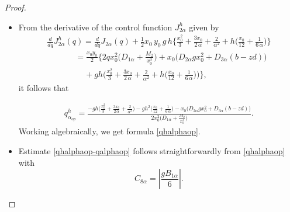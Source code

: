 \documentclass[axioms,article,submit,moreauthors]{Definitions/mdpi}
\begin{document}
    \begin{proof} $ $
    
    
    
    \begin{itemize}
    \item[(a)]From the derivative of the control function ${ J^h_{2 \alpha}}$ given by
     \begin{equation*}
  \begin{array}{ll}
  { \frac{d}{dq} J^h_{2 \alpha}}(q)= {\frac{d}{dq}J_{2\alpha}}(q) + \tfrac{1}{2} x_0\,y_0 \,g \,h \Big \{   \tfrac{ x_0^2}{3} 
    + \tfrac{3 x_0 }{2\,\alpha} + \tfrac{2}{\alpha^2}
    + h \Big( \tfrac{x_0}{12} + \tfrac{1}{6\,\alpha} \Big) \Big\}\\[0.45cm] 
   \qquad \quad \ \ =\frac{x_0 y_0}{2} \Big\{2qx_0^2 \Big( D_{1\alpha}+\frac{M_2}{x_0^3}\Big) +x_0 \Big(D_{2\alpha} g x_0^2+ D_{3\alpha} (b-zd) \Big)\\[0.45cm]
   \qquad \qquad \; \; +gh\Big(   \tfrac{ x_0^2}{3} + \tfrac{3 x_0 }{2\,\alpha} + \tfrac{2}{\alpha^2}
    + h \Big( \tfrac{x_0}{12} + \tfrac{1}{6\,\alpha} \Big)\Big)\Big\},
    \end{array}
    \end{equation*}
    it follows that
    
      \begin{equation*}
  \begin{array}{ll}
  { q^h_{\alpha_{op}}}=  \frac{- gh\Big(   \tfrac{ x_0^2}{3} 
    + \tfrac{3 x_0 }{2\,\alpha} + \tfrac{2}{\alpha^2}\Big)-g h^2\Big( \tfrac{x_0}{12} + \tfrac{1}{6\,\alpha} \Big)- x_0 \Big(D_{2\alpha} g x_0^2+ D_{3\alpha} (b-zd) \Big)}{2x_0^2  \Big( D_{1\alpha}+\frac{M_2}{x_0^3}\Big)}.
    \end{array}
    \end{equation*}
    Working algebraically, we get formula \eqref{qhalphaop}.
    
    \item[(b)] Estimate  \eqref{qhalphaop-qalphaop} follows straightforwardly from \eqref{qhalphaop} with
    \[C_{8\alpha}=\left\lvert  \frac{g B_{1\alpha}}{6}\right\rvert.\]
    

\end{itemize}
\end{proof}
\end{document}
